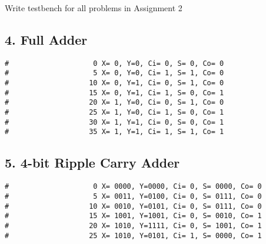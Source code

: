 \documentclass{vhdl-assignment}
\begin{document}
\begin{problem}{Write testbench for all problems in Assignment 2}
    \subsection*{4. Full Adder}
\begin{lstlisting}[caption=Full Adder Testbench Output]
#                    0 X= 0, Y=0, Ci= 0, S= 0, Co= 0
#                    5 X= 0, Y=0, Ci= 1, S= 1, Co= 0
#                   10 X= 0, Y=1, Ci= 0, S= 1, Co= 0
#                   15 X= 0, Y=1, Ci= 1, S= 0, Co= 1
#                   20 X= 1, Y=0, Ci= 0, S= 1, Co= 0
#                   25 X= 1, Y=0, Ci= 1, S= 0, Co= 1
#                   30 X= 1, Y=1, Ci= 0, S= 0, Co= 1
#                   35 X= 1, Y=1, Ci= 1, S= 1, Co= 1    
\end{lstlisting}
    
    \subsection*{5. 4-bit Ripple Carry Adder}
\begin{lstlisting}[caption=Full Adder Testbench Output]
#                    0 X= 0000, Y=0000, Ci= 0, S= 0000, Co= 0
#                    5 X= 0011, Y=0100, Ci= 0, S= 0111, Co= 0
#                   10 X= 0010, Y=0101, Ci= 0, S= 0111, Co= 0
#                   15 X= 1001, Y=1001, Ci= 0, S= 0010, Co= 1
#                   20 X= 1010, Y=1111, Ci= 0, S= 1001, Co= 1
#                   25 X= 1010, Y=0101, Ci= 1, S= 0000, Co= 1   
\end{lstlisting}
\end{problem}
\end{document}
